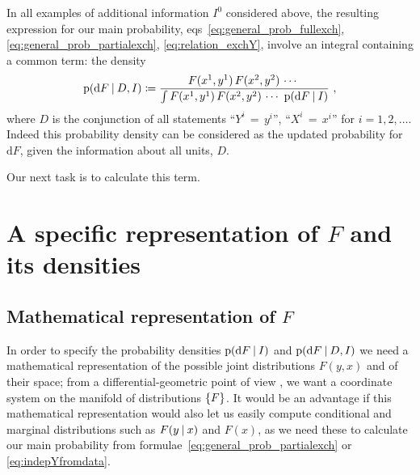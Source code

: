 \documentclass[\ifafour a4paper,12pt,\else a5paper,10pt,\fi%
onecolumn,oneside,article,%
british%
]{memoir}
\theoremstyle{remark}
\theoremstyle{innote}
\newcommand*{\di}{\mathrm{d}}%
\newcommand*{\defd}{\coloneqq}
\DeclarePairedDelimiter\set{\{}{\}} %
\newcommand*{\p}{\mathrm{p}}%
\renewcommand*{\|}[1][]{\nonscript\:#1\vert\nonscript\:\mathopen{}}
\newcommand*{\mo}[1][=]{\mathord{\,#1\,}}
\newcommand*{\eqns}{eqs}%
\newcommand*{\prop}[1]{\enquote{\textsf{#1}}}%
\begin{document}
In all examples of additional information $I^{0}$ considered above, the resulting expression for our main probability, \eqns~\eqref{eq:general_prob_fullexch}, \eqref{eq:general_prob_partialexch}, \eqref{eq:relation_exchY}, involve an integral containing a common term: the density
\begin{equation}
  \label{eq:common_density}
  \p(\di F \|D,I) \defd
    \frac{
    F(x^{1},y^{1})\,F(x^{2},y^{2})\,\dotsm\  
  }{
   \int F(x^{1},y^{1})\,F(x^{2},y^{2})\,\dotsm\  \p(\di F \|I)
  } \ ,
\end{equation}
where $D$ is the conjunction of all statements \prop{$Y^{i}\mo y^{i}$}, \prop{$X^{i}\mo x^{i}$} for $i=1,2,\dotsc$. Indeed this probability density can be considered as the updated probability for $\di F$, given the information about all units, $D$.

Our next task is to calculate this term.


\section{A specific representation of $F$ and its densities}
\label{sec:repr_density_F}

\subsection{Mathematical representation of $F$}
\label{sec:repr_F_convexsum}


In order to specify the probability densities $\p(\di F \| I)$ and $\p(\di F \| D, I)$ we need a mathematical representation of the possible joint distributions $F(y,x)$ and of their space; from a differential-geometric point of view \autocites[III.A, VII.A]{choquetbruhatetal1977_r1996}, we want a coordinate system on the manifold of distributions $\set{F}$. It would be an advantage if this mathematical representation would also let us easily compute conditional and marginal distributions such as $F(y\| x)$ and $F(x)$, as we need these to calculate our main probability from formulae~\eqref{eq:general_prob_partialexch} or \eqref{eq:indepYfromdata}.
\end{document}
